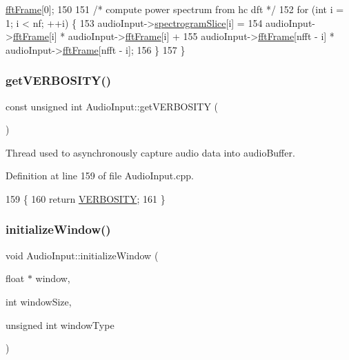 \begin{DoxyCode}
      \mbox{\hyperlink{classAudioInput_a0c0e5c44a1547a97564e0733aaac2dc0}{fftFrame}}[0];
150 
151     \textcolor{comment}{/* compute power spectrum from hc dft */}
152     \textcolor{keywordflow}{for} (\textcolor{keywordtype}{int} i = 1; i < nf; ++i) \{
153         audioInput->\mbox{\hyperlink{classAudioInput_aa277accc3be5054fe8439ac7086deaf5}{spectrogramSlice}}[i] =
154                 audioInput->\mbox{\hyperlink{classAudioInput_a0c0e5c44a1547a97564e0733aaac2dc0}{fftFrame}}[i] * audioInput->\mbox{\hyperlink{classAudioInput_a0c0e5c44a1547a97564e0733aaac2dc0}{fftFrame}}[i] +
155                 audioInput->\mbox{\hyperlink{classAudioInput_a0c0e5c44a1547a97564e0733aaac2dc0}{fftFrame}}[nfft - i] * audioInput->\mbox{\hyperlink{classAudioInput_a0c0e5c44a1547a97564e0733aaac2dc0}{fftFrame}}[nfft - i];
156     \}
157 \}
\end{DoxyCode}
\mbox{\label{classAudioInput_a76a26e018987d0a303a32852ebf85254}} 
\subsubsection{\texorpdfstring{get\+V\+E\+R\+B\+O\+S\+I\+T\+Y()}{getVERBOSITY()}}
{\footnotesize\ttfamily const unsigned int Audio\+Input\+::get\+V\+E\+R\+B\+O\+S\+I\+TY (\begin{DoxyParamCaption}{ }\end{DoxyParamCaption})\hspace{0.3cm}{\ttfamily [static]}}

Thread used to asynchronously capture audio data into audio\+Buffer. 

Definition at line 159 of file Audio\+Input.\+cpp.


\begin{DoxyCode}
159                                             \{
160     \textcolor{keywordflow}{return} \mbox{\hyperlink{classAudioInput_aff0f7df20d558ba13f85b3d49b7f42b2}{VERBOSITY}};
161 \}
\end{DoxyCode}
\mbox{\label{classAudioInput_abe6c5796db5f1f0d4944a3c9e8b3962e}} 
\subsubsection{\texorpdfstring{initialize\+Window()}{initializeWindow()}}
{\footnotesize\ttfamily void Audio\+Input\+::initialize\+Window (\begin{DoxyParamCaption}\item[{float $\ast$}]{window,  }\item[{int}]{window\+Size,  }\item[{unsigned int}]{window\+Type }\end{DoxyParamCaption})}

